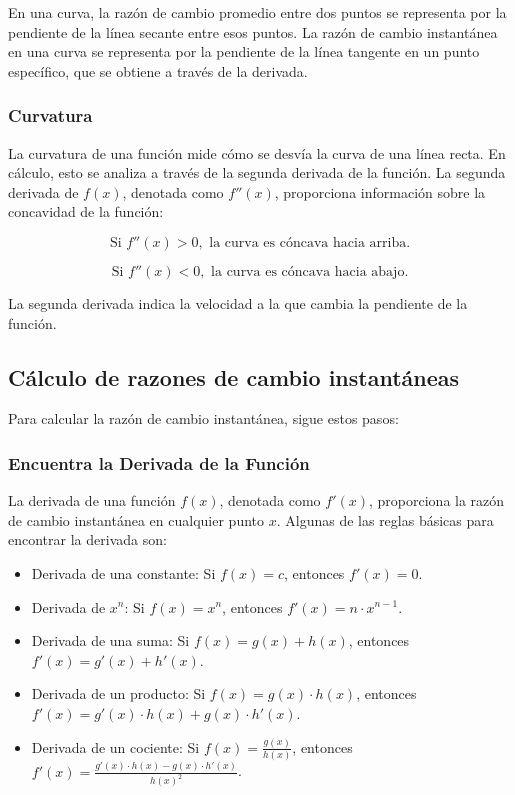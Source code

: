 En una curva, la razón de cambio promedio entre dos puntos se representa por la pendiente de la línea secante entre esos puntos. La razón de cambio instantánea en una curva se representa por la pendiente de la línea tangente en un punto específico, que se obtiene a través de la derivada.

\subsubsection{Curvatura}

La curvatura de una función mide cómo se desvía la curva de una línea recta. En cálculo, esto se analiza a través de la segunda derivada de la función. La segunda derivada de \( f(x) \), denotada como \( f''(x) \), proporciona información sobre la concavidad de la función:

\[
\text{Si } f''(x) > 0, \text{ la curva es cóncava hacia arriba.}
\]

\[
\text{Si } f''(x) < 0, \text{ la curva es cóncava hacia abajo.}
\]

La segunda derivada indica la velocidad a la que cambia la pendiente de la función.





\subsection{Cálculo de razones de cambio instantáneas}
Para calcular la razón de cambio instantánea, sigue estos pasos:

\subsubsection{Encuentra la Derivada de la Función}

La derivada de una función \( f(x) \), denotada como \( f'(x) \), proporciona la razón de cambio instantánea en cualquier punto \( x \). Algunas de las reglas básicas para encontrar la derivada son:

\begin{itemize}
    \item Derivada de una constante: Si \( f(x) = c \), entonces \( f'(x) = 0 \).
    \item Derivada de \( x^n \): Si \( f(x) = x^n \), entonces \( f'(x) = n \cdot x^{n-1} \).
    \item Derivada de una suma: Si \( f(x) = g(x) + h(x) \), entonces \( f'(x) = g'(x) + h'(x) \).
    \item Derivada de un producto: Si \( f(x) = g(x) \cdot h(x) \), entonces \( f'(x) = g'(x) \cdot h(x) + g(x) \cdot h'(x) \).
    \item Derivada de un cociente: Si \( f(x) = \frac{g(x)}{h(x)} \), entonces \( f'(x) = \frac{g'(x) \cdot h(x) - g(x) \cdot h'(x)}{h(x)^2} \).
\end{itemize}

